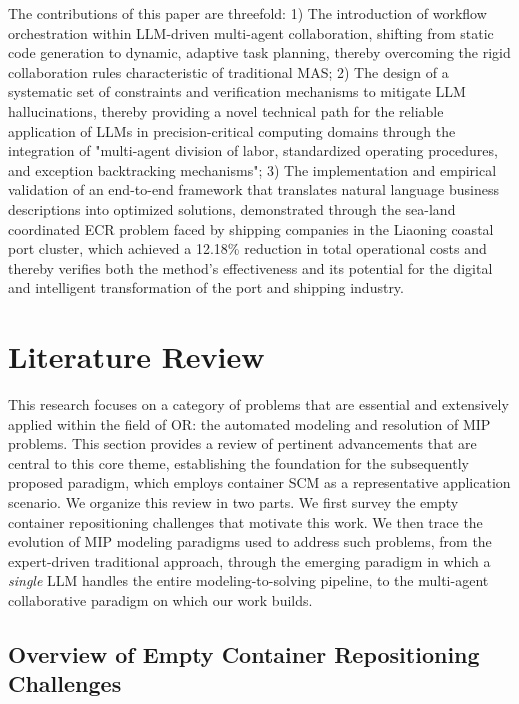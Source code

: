 \documentclass[preprint,12pt]{elsarticle}
\begin{document}
The contributions of this paper are threefold: 1) The introduction of workflow orchestration within LLM-driven multi-agent collaboration, shifting from static code generation to dynamic, adaptive task planning, thereby overcoming the rigid collaboration rules characteristic of traditional MAS; 2) The design of a systematic set of constraints and verification mechanisms to mitigate LLM hallucinations, thereby providing a novel technical path for the reliable application of LLMs in precision-critical computing domains through the integration of "multi-agent division of labor, standardized operating procedures, and exception backtracking mechanisms"; 3) The implementation and empirical validation of an end-to-end framework that translates natural language business descriptions into optimized solutions, demonstrated through the sea-land coordinated ECR problem faced by shipping companies in the Liaoning coastal port cluster, which achieved a 12.18\% reduction in total operational costs and thereby verifies both the method's effectiveness and its potential for the digital and intelligent transformation of the port and shipping industry.


\section{Literature Review}
This research focuses on a category of problems that are essential and extensively applied within the field of OR: the automated modeling and resolution of MIP problems. This section provides a review of pertinent advancements that are central to this core theme, establishing the foundation for the subsequently proposed paradigm, which employs container SCM as a representative application scenario. We organize this review in two parts. We first survey the empty container repositioning challenges that motivate this work. We then trace the evolution of MIP modeling paradigms used to address such problems, from the expert-driven traditional approach, through the emerging paradigm in which a \emph{single} LLM handles the entire modeling-to-solving pipeline, to the multi-agent collaborative paradigm on which our work builds.

\subsection{Overview of Empty Container Repositioning Challenges}
\end{document}
